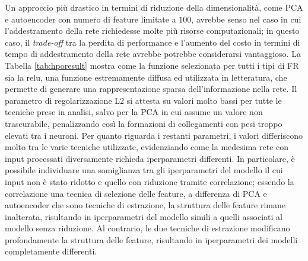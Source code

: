 Un approccio più drastico in termini di riduzione della dimensionalità, come PCA e autoencoder con numero di feature limitate a $100$, avrebbe senso nel caso in cui l'addestramento della rete richiedesse molte più risorse computazionali; in questo caso, il \textit{trade-off} tra la perdita di performance e l'aumento del costo in termini di tempo di addestramento della rete avrebbe potrebbe considerarsi vantaggioso.
La Tabella \ref{tab:hporesult} mostra come la funzione selezionata per tutti i tipi di FR sia la relu, una funzione estremamente diffusa ed utilizzata in letteratura, che permette di generare una rappresentazione sparsa dell'informazione nella rete. Il parametro di regolarizzazione L2 si attesta su valori molto bassi per tutte le tecniche prese in analisi, salvo per la PCA in cui assume un valore non trascurabile, penalizzando così la formazioni di collegamenti con pesi troppo elevati tra i neuroni. Per quanto riguarda i restanti parametri, i valori differiscono molto tra le varie tecniche utilizzate, evidenziando come la medesima rete con input processati diversamente richieda iperparametri differenti. In particolare, è possibile individuare una somiglianza tra gli iperparametri del modello il cui input non è stato ridotto e quello con riduzione tramite correlazione; essendo la correlazione una tecnica di selezione delle feature, a differenza di PCA e autoencoder che sono tecniche di estrazione, la struttura delle feature rimane inalterata, risultando in iperparametri del modello simili a quelli associati al modello senza riduzione. Al contrario, le due tecniche di estrazione modificano profondamente la struttura delle feature, risultando in iperparametri dei modelli completamente differenti.

